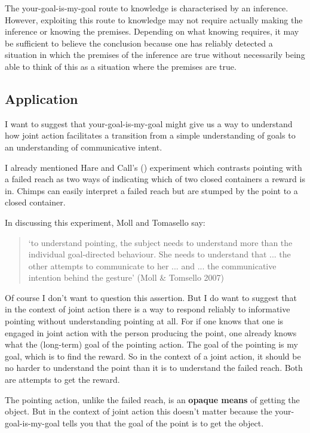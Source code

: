 \documentclass[12pt,a4paper]{extarticle}
\begin{document}
The your-goal-is-my-goal route to knowledge is characterised by an inference.  However, exploiting this route to knowledge may not require actually making the inference or knowing the premises.  Depending on what knowing requires, it may be sufficient to believe the conclusion because one has reliably detected a situation in which the premises of the inference are true without necessarily being able to think of this as a situation where the premises are true.


\subsection{Application}
I want to suggest that your-goal-is-my-goal might give us a way to understand how joint action facilitates a transition from a simple understanding of goals to an understanding of communicative intent.

I already mentioned Hare and Call's (\citeyear{hare_chimpanzees_2004}) experiment which contrasts pointing with a failed reach as two ways of indicating which of two closed containers a reward is in.  
Chimps can easily interpret a failed reach but are stumped by the point to a closed container.

In discussing this experiment, Moll and Tomasello say:
%
\begin{quote}
`to understand pointing, the subject needs to understand more than the individual goal-directed behaviour. She needs to understand that ... the other attempts to communicate to her ...  and ... the communicative intention behind the gesture'
(Moll \& Tomsello 2007)
\end{quote}
%
Of course I don't want to question this assertion.
But I do want to suggest that in the context of joint action there is a way to respond reliably to informative pointing without understanding pointing at all.
For if one knows that one is engaged in joint action with the person producing the point, one already knows what the (long-term) goal of the pointing action.  
The goal of the pointing is my goal, which is to find the reward.
So in the context of a joint action, it should be no harder to understand the point than it is to understand the failed reach.
Both are attempts to get the reward.

The pointing action, unlike the failed reach, is an \textbf{opaque means} of getting the object.  But in the context of joint action this doesn't matter because the your-goal-is-my-goal tells you that the goal of the point is to get the object.
\end{document}
